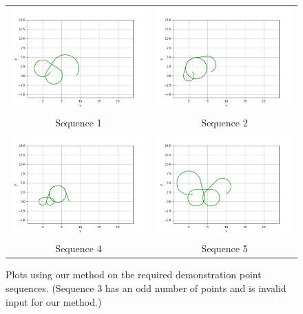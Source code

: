 \documentclass{article}
\begin{document}
\begin{center}
\begin{figure}[ht]
\centering
\begin{tabular}{cc}

\includegraphics[width=0.4\linewidth]{Plots/DemoPlot1.png} &
\includegraphics[width=0.4\linewidth]{Plots/DemoPlot2.png} \\
Sequence 1 & Sequence 2 \\ %

\includegraphics[width=0.4\linewidth]{Plots/DemoPlot4.png} &
\includegraphics[width=0.4\linewidth]{Plots/DemoPlot5.png} \\
Sequence 4 & Sequence 5 \\ %

\end{tabular}
\caption{Plots using our method on the required demonstration point sequences. (Sequence 3 has an odd number of points and is invalid input for our method.)}
\label{fig:demo_sequences}
\end{figure}
\end{center}
\end{document}
